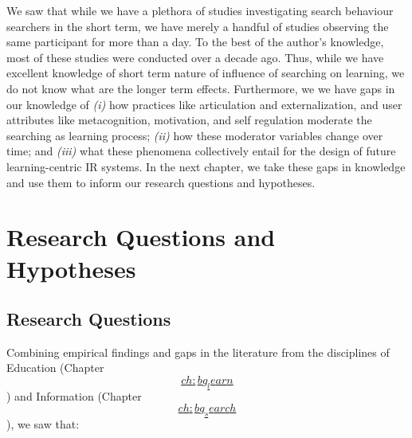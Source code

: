 \documentclass[a4paper, nobind]{templates/ociamthesis}
\begin{document}
We saw that while we have a plethora of studies investigating search
behaviour searchers in the short term, we have merely a handful of
studies observing the same participant for more than a day. To the best
of the author's knowledge, most of these studies were conducted over a
decade ago. Thus, while we have excellent knowledge of short term nature
of influence of searching on learning, we do not know what are the
longer term effects. Furthermore, we we have gaps in our knowledge of
\emph{(i)} how practices like articulation and externalization, and user
attributes like metacognition, motivation, and self regulation moderate
the searching as learning process; \emph{(ii)} how these moderator variables
change over time; and \emph{(iii)} what these phenomena collectively entail
for the design of future learning-centric IR systems. In the next
chapter, we take these gaps in knowledge and use them to inform our
research questions and hypotheses.

\hypertarget{research-questions-and-hypotheses}{%
\chapter{Research Questions and Hypotheses}\label{research-questions-and-hypotheses}}

\hypertarget{sec:rq}{%
\section{Research Questions}\label{sec:rq}}

Combining empirical findings and gaps in the literature from the
disciplines of Education (Chapter
\protect\hyperlink{ch:bg_learn}{\[ch:bg_learn\]}) and Information (Chapter
\protect\hyperlink{ch:bg_search}{\[ch:bg_search\]}), we saw that:
\end{document}
